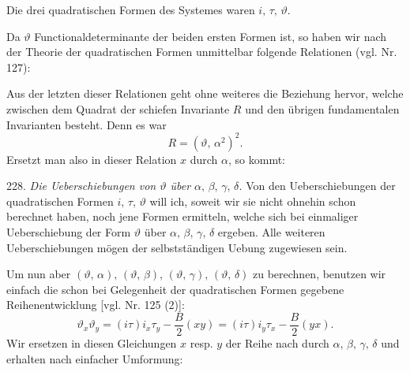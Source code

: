 Die drei quadratischen Formen des Systemes waren $i,\,\tau,\,\vartheta$.



Da $\vartheta$ Functionaldeterminante der beiden ersten Formen ist, so haben wir nach der Theorie der quadratischen Formen unmittelbar folgende Relationen (vgl. Nr. 127):





Aus der letzten dieser Relationen geht ohne weiteres die Beziehung hervor, welche zwischen dem Quadrat der schiefen Invariante $R$ und den übrigen fundamentalen Invarianten besteht. Denn es war
\[
R = (\vartheta,\,\alpha^2)^2.
\]
Ersetzt man also in dieser Relation $x$ durch $\alpha$, so kommt:


228. \textit{Die Ueberschiebungen von $\vartheta$ über $\alpha,\,\beta,\,\gamma,\,\delta$.} Von den Ueberschiebungen der quadratischen Formen $i,\,\tau,\,\vartheta$ will ich, soweit wir sie nicht ohnehin schon berechnet haben, noch jene Formen ermitteln, welche sich bei einmaliger Ueberschiebung der Form $\vartheta$ über $\alpha,\,\beta,\,\gamma,\,\delta$ ergeben. Alle weiteren Ueberschiebungen mögen der selbstständigen Uebung zugewiesen sein.

Um nun aber $(\vartheta,\,\alpha),\,(\vartheta,\,\beta),\,(\vartheta,\,\gamma),\,(\vartheta,\,\delta)$ zu berechnen, benutzen wir einfach die schon bei Gelegenheit der quadratischen Formen gegebene Reihenentwicklung [vgl. Nr. 125 (2)]:
\[
\vartheta_x\vartheta_y = (i\tau)i_x\tau_y - \frac{B}{2}(xy) = (i\tau)i_y\tau_x - \frac{B}{2}(yx).
\]
Wir ersetzen in diesen Gleichungen $x$ resp. $y$ der Reihe nach durch $\alpha,\,\beta,\,\gamma,\,\delta$ und erhalten nach einfacher Umformung:


